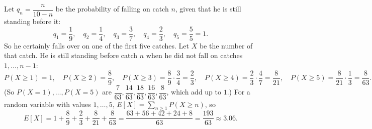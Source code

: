 Let $q_n=\dfrac{n}{10-n}$ be the probability of falling on catch $n$, given that he is still standing before it:
\[q_1=\dfrac19,\quad q_2=\dfrac14,\quad q_3=\dfrac37,\quad q_4=\dfrac23,\quad q_5=\dfrac55=1.\]
So he certainly falls over on one of the first five catches. Let $X$ be the number of that catch. He is still standing before catch $n$ when he did not fall on catches $1,\dots,n-1$:
\[P(X\ge1)=1,\quad P(X\ge2)=\dfrac89,\quad P(X\ge3)=\dfrac89\cdot\dfrac34=\dfrac23,\quad P(X\ge4)=\dfrac23\cdot\dfrac47=\dfrac{8}{21},\quad P(X\ge5)=\dfrac{8}{21}\cdot\dfrac13=\dfrac{8}{63}.\]
(So $P(X=1),\dots,P(X=5)$ are $\dfrac{7}{63},\dfrac{14}{63},\dfrac{18}{63},\dfrac{16}{63},\dfrac{8}{63}$, which add up to $1$.) For a random variable with values $1,\dots,5$, $E[X]=\sum_{n\ge1}P(X\ge n)$, so
\[E[X]=1+\dfrac89+\dfrac23+\dfrac{8}{21}+\dfrac{8}{63}=\dfrac{63+56+42+24+8}{63}=\boxed{\dfrac{193}{63}}\approx3.06.\]
